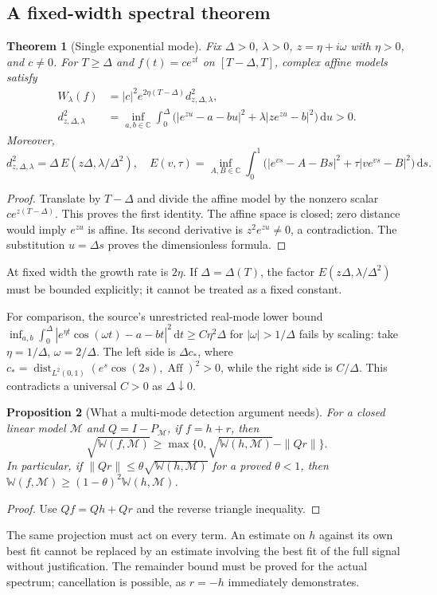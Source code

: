 \documentclass[11pt,letterpaper]{article}
\newtheorem{theorem}{Theorem}[section]
\newtheorem{proposition}[theorem]{Proposition}
\newcommand{\MM}{\mathcal M}
\newcommand{\WW}{\mathbb W}
\newcommand{\dd}{\,\mathrm d}
\newcommand{\C}{\mathbb C}
\begin{document}
\subsection{A fixed-width spectral theorem}
\begin{theorem}[Single exponential mode]\label{thm:mode}
Fix $\Delta>0$, $\lambda>0$, $z=\eta+i\omega$ with $\eta>0$, and $c\ne0$.
For $T\ge\Delta$ and $f(t)=c e^{zt}$ on $[T-\Delta,T]$, complex affine
models satisfy
\begin{align}
W_\lambda(f)&=|c|^2 e^{2\eta(T-\Delta)}d_{z,\Delta,\lambda}^2,\\
d_{z,\Delta,\lambda}^2
&=\inf_{a,b\in\C}\int_0^\Delta
\bigl(|e^{zu}-a-bu|^2+\lambda|ze^{zu}-b|^2\bigr)\dd u>0.
\end{align}
Moreover,
\[
d_{z,\Delta,\lambda}^2
=\Delta\,E(z\Delta,\lambda/\Delta^2),
\quad
E(v,\tau)=\inf_{A,B\in\C}\int_0^1
\bigl(|e^{vs}-A-Bs|^2+\tau|ve^{vs}-B|^2\bigr)\dd s.
\]
\end{theorem}
\begin{proof}
Translate by $T-\Delta$ and divide the affine model by the nonzero
scalar $ce^{z(T-\Delta)}$. This proves the first identity.
The affine space is closed; zero distance would imply $e^{zu}$
is affine. Its second derivative is $z^2e^{zu}\ne0$, a contradiction.
The substitution $u=\Delta s$ proves the dimensionless formula.
\end{proof}
At fixed width the growth rate is $2\eta$. If $\Delta=\Delta(T)$,
the factor $E(z\Delta,\lambda/\Delta^2)$ must be bounded explicitly;
it cannot be treated as a fixed constant.

For comparison, the source's unrestricted real-mode lower bound
$\inf_{a,b}\int_0^\Delta|e^{\eta t}\cos(\omega t)-a-bt|^2\dd t
\ge C\eta^2\Delta$ for $|\omega|>1/\Delta$ fails by scaling:
take $\eta=1/\Delta$, $\omega=2/\Delta$.
The left side is $\Delta c_*$, where
$c_*=\operatorname{dist}_{L^2(0,1)}(e^s\cos(2s),\operatorname{Aff})^2>0$,
while the right side is $C/\Delta$. This contradicts a universal
$C>0$ as $\Delta\downarrow0$.

\begin{proposition}[What a multi-mode detection argument needs]\label{prop:remainder}
For a closed linear model $\MM$ and $Q=I-P_\MM$, if $f=h+r$, then
\[
\sqrt{\WW(f,\MM)}
\ge\max\{0,\sqrt{\WW(h,\MM)}-\|Qr\|\}.
\]
In particular, if $\|Qr\|\le\theta\sqrt{\WW(h,\MM)}$ for a proved
$\theta<1$, then
$\WW(f,\MM)\ge(1-\theta)^2\WW(h,\MM)$.
\end{proposition}
\begin{proof}
Use $Qf=Qh+Qr$ and the reverse triangle inequality.
\end{proof}
The same projection must act on every term. An estimate on $h$
against its own best fit cannot be replaced by an estimate involving
the best fit of the full signal without justification. The remainder
bound must be proved for the actual spectrum; cancellation is possible,
as $r=-h$ immediately demonstrates.
\end{document}
